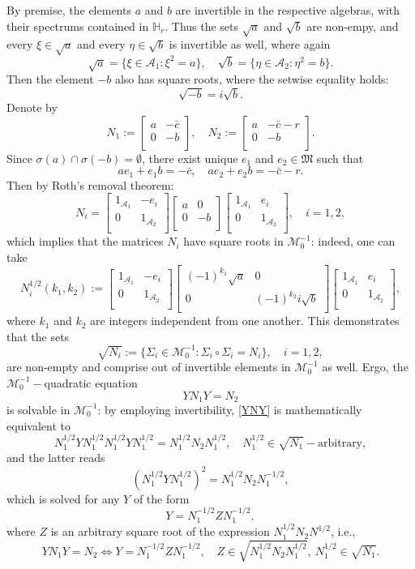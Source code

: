 \documentclass{article}
\theoremstyle{definition}
\def\A{{\mathcal{A}}}
\def\M{\mathfrak{M}}
\def\HR{\mathbb{H}_r}
\newcommand{\mat}[4]{\left[\begin{array}{cc}#1 & #2 \\ #3 & #4 \\
	\end{array}\right]}
\begin{document}
By premise, the elements $a$ and $b$ are invertible in the respective algebras, with their spectrums contained in $\HR$. Thus the sets $\sqrt{a}$ and $\sqrt{b}$ are non-empy, and every $\xi\in\sqrt{a}$ and every $\eta\in\sqrt{b}$ is invertible as well, where again
$$\sqrt{a}=\{\xi\in\A_1: \xi^2=a\},\quad \sqrt{b}=\{\eta\in\A_2: \eta^2=b\}.$$
Then the element $-b$ also has square roots, where the setwise equality holds:
$$\sqrt{-b}=i\sqrt{b}.$$
Denote by 
$$N_1:=\mat{a}{-\bar{c}}{0}{-b},\quad N_2:=\mat{a}{-\bar{c}-r}{0}{-b}.$$
Since $\sigma(a)\cap\sigma(-b)=\emptyset$, there exist unique $e_1$ and $e_2\in\M$ such that
$$ae_1+e_1b=-\bar{c},\quad ae_2+e_2b=-\bar{c}-r.$$
Then by Roth's removal theorem:
$$N_i=\mat{1_{\A_1}}{-e_i}{0}{1_{\A_2}}\mat{a}{0}{0}{-b}\mat{1_{\A_1}}{e_i}{0}{1_{\A_2}},\quad i=1,2,$$
which implies that the matrices $N_i$ have square roots in $\mathcal{M}^{-1}_0$: indeed, one can take
$$N_i^{1/2}(k_1,k_2):=\mat{1_{\A_1}}{-e_i}{0}{1_{\A_2}}\mat{(-1)^{k_1}\sqrt{a}}{0}{0}{(-1)^{k_2}i\sqrt{b}}\mat{1_{\A_1}}{e_i}{0}{1_{\A_2}},$$
where $k_1$ and $k_2$ are integers independent from one another. This demonstrates that the sets 
$$\sqrt{N_i}:=\{ \Sigma_i\in\mathcal{M}^{-1}_0: \Sigma_i\circ\Sigma_i=N_i\},\quad i=1,2,$$
are non-empty and comprise out of invertible elements in $\mathcal{M}_0^{-1}$ as well. Ergo, the $\mathcal{M}_0^{-1}-$quadratic equation
\begin{equation}\label{YNY}YN_1Y=N_2\end{equation}
is solvable in $\mathcal{M}^{-1}_0$: by employing invertibility, \eqref{YNY} is mathematically equivalent to
\begin{equation}\label{N12}
N_1^{1/2}YN_1^{1/2}N_1^{1/2}YN_1^{1/2}=N_1^{1/2}N_2N_1^{1/2},\quad N_1^{1/2}\in\sqrt{N_1}-\textrm{arbitrary},\end{equation}
and the latter reads
\begin{equation}\label{Y2}
\left(N_1^{1/2}YN_1^{1/2}\right)^2=N_1^{1/2}N_2N_1^{-1/2},
\end{equation}
which is solved for any $Y$ of the form 
\begin{equation}\label{YZ}
Y=N_1^{-1/2}ZN_1^{-1/2},
\end{equation}
where $Z$ is an arbitrary square root of the expression $N_1^{1/2}N_2N^{1/2}$, i.e., 
\begin{equation}\label{ZY}YN_1Y=N_2\Leftrightarrow Y=N_1^{-1/2}ZN_1^{-1/2},\quad Z\in\sqrt{N_1^{1/2}N_2N_1^{1/2}}, \ N_1^{1/2}\in\sqrt{N_1}.\end{equation}
\end{document}
